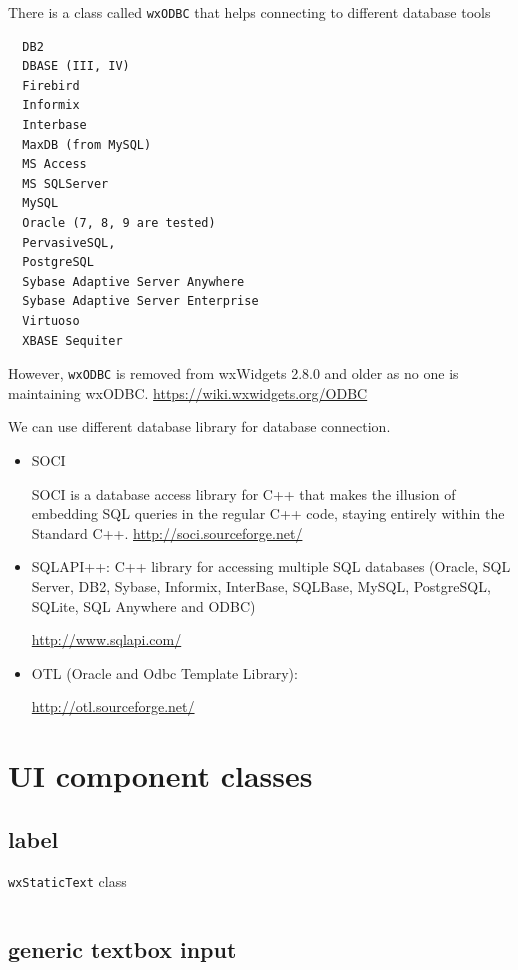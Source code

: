 There is a class called \verb!wxODBC! that helps connecting to different database tools
\begin{verbatim}
  DB2
  DBASE (III, IV)
  Firebird
  Informix
  Interbase
  MaxDB (from MySQL)
  MS Access
  MS SQLServer
  MySQL
  Oracle (7, 8, 9 are tested)
  PervasiveSQL,
  PostgreSQL
  Sybase Adaptive Server Anywhere
  Sybase Adaptive Server Enterprise
  Virtuoso
  XBASE Sequiter
\end{verbatim}
However, \verb!wxODBC! is removed from wxWidgets 2.8.0 and older as no one is maintaining wxODBC.
\url{https://wiki.wxwidgets.org/ODBC}

We can use different database library for database connection. 
\begin{itemize}
  \item SOCI
  
SOCI is a database access library for C++ that makes the illusion of embedding SQL queries in the regular C++ code, staying entirely within the Standard C++.
\url{http://soci.sourceforge.net/}

  \item SQLAPI++:  C++ library for accessing multiple SQL databases (Oracle, SQL Server, DB2, Sybase, Informix, InterBase, SQLBase, MySQL, PostgreSQL, SQLite, SQL Anywhere and ODBC)
  
\url{http://www.sqlapi.com/}

  \item OTL (Oracle and Odbc Template Library):
  
  \url{http://otl.sourceforge.net/} 
\end{itemize}


\section{UI component classes}

\subsection{label}

\verb!wxStaticText! class
\begin{verbatim}

\end{verbatim}

\subsection{generic textbox input}

